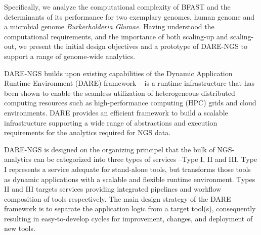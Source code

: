 \documentclass{cpeauth}
\begin{document}

Specifically, we analyze the computational complexity of
BFAST\cite{bfast2009, bfast2009b} and the determinants of its
performance for two exemplary genomes, human genome and a microbial
genome {\it Burkerholderia Glumae}\cite{kim2011}.  Having understood
the computational requirements, and the importance of both scaling-up
and scaling-out, we present the initial design objectives and a
prototype of DARE-NGS to support a range of genome-wide analytics.
 
DARE-NGS builds upon existing capabilities of the Dynamic Application
Runtime Environment (DARE) framework\cite{dare-tg11} -- is a runtime
infrastructure that has been shown to enable the seamless utilization
of heterogeneous distributed computing
resources\cite{jha2009developing,saga-royalsoc,saga-ccgrid10} such as
high-performance computing (HPC) grids and cloud environments.  DARE
provides an efficient framework to build a scalable infrastructure supporting a wide range of abstractions and
execution requirements for the analytics required for NGS data.

DARE-NGS is designed on the organizing principel that the bulk of
NGS-analytics can be categorized into three types of services --Type
I, II and III. Type I represents a service adequate for stand-alone tools, but transforms those tools
as dynamic applications with a scalable and flexible runtime environment. Types II and III
targets services providing integrated pipelines and workflow composition of tools
respectively.  The main design strategy of the DARE framework is to
separate the application logic from a target tool(s), consequently
resulting in easy-to-develop cycles for improvement, changes, and
deployment of new tools.
\end{document}
